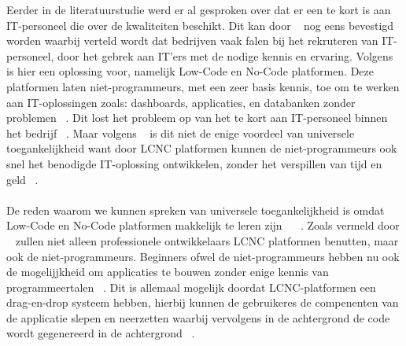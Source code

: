 Eerder in de literatuurstudie werd er al gesproken over dat er een te kort is aan IT-personeel die over de kwaliteiten beschikt. 
Dit kan door ~\textcite{Sufi_2023} nog eens bevestigd worden waarbij 
verteld wordt dat bedrijven vaak falen bij het rekruteren van IT-personeel, door het gebrek aan IT'ers met de nodige kennis en ervaring.
Volgens ~\textcite{Sufi_2023} is hier een oplossing voor, namelijk Low-Code en No-Code platformen. Deze platformen laten niet-programmeurs, met een zeer basis kennis,
toe om te werken aan IT-oplossingen zoals: dashboards, applicaties, en databanken zonder problemen ~\autocite{Sufi_2023}. Dit lost het probleem op van het te kort aan IT-personeel binnen het bedrijf ~\autocite{Sufi_2023}.
Maar volgens ~\textcite{Sufi_2023} is dit niet de enige voordeel van universele toegankelijkheid want door LCNC platformen kunnen de niet-programmeurs ook
snel het benodigde IT-oplossing ontwikkelen, zonder het verspillen van tijd en geld ~\autocite{Sufi_2023}.
\\
\\
De reden waarom we kunnen spreken van universele toegankelijkheid is omdat Low-Code en No-Code platformen makkelijk te leren zijn ~\autocite{Sufi_2023} ~\autocite{ALSAADI_2021}.
Zoals vermeld door ~\textcite{ALSAADI_2021} zullen niet alleen professionele ontwikkelaars LCNC platformen benutten, maar ook de niet-programmeurs.
Beginners ofwel de niet-programmeurs hebben nu ook de mogelijjkheid om applicaties te bouwen zonder enige kennis van programmeertalen ~\autocite{ALSAADI_2021}.
Dit is allemaal mogelijk doordat LCNC-platformen een drag-en-drop systeem hebben, hierbij kunnen de gebruikeres de compenenten van de applicatie slepen en neerzetten waarbij vervolgens in de achtergrond de code wordt 
gegenereerd in de achtergrond ~\autocite{ALSAADI_2021}.


